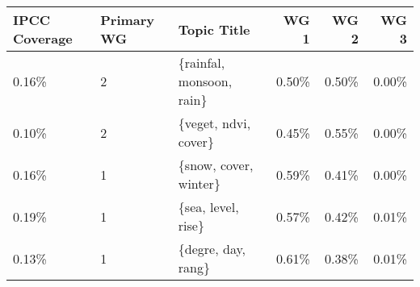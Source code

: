 \begin{tabular}{p{1.4cm} p{1cm} l r r r}
\toprule
 IPCC Coverage &  Primary WG &               Topic Title &  WG 1 &  WG 2 &  WG 3 \\
\midrule
         0.16\% &           2 &  \{rainfal, monsoon, rain\} & 0.50\% & 0.50\% & 0.00\% \\
         0.10\% &           2 &      \{veget, ndvi, cover\} & 0.45\% & 0.55\% & 0.00\% \\
         0.16\% &           1 &     \{snow, cover, winter\} & 0.59\% & 0.41\% & 0.00\% \\
         0.19\% &           1 &        \{sea, level, rise\} & 0.57\% & 0.42\% & 0.01\% \\
         0.13\% &           1 &        \{degre, day, rang\} & 0.61\% & 0.38\% & 0.01\% \\
\bottomrule
\end{tabular}
